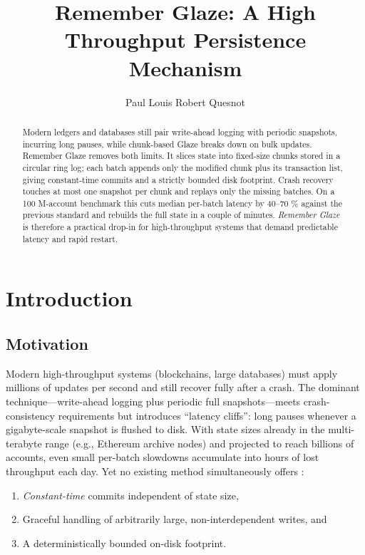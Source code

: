 \documentclass[conference]{IEEEtran}
\title{Remember Glaze: A High Throughput Persistence Mechanism}
\author{Paul Louis Robert Quesnot}
\begin{document}
\maketitle

\begin{abstract}
   Modern ledgers and databases still pair write-ahead logging with periodic snapshots, incurring long pauses, while chunk-based Glaze breaks down on bulk updates. Remember Glaze removes both limits. It slices state into fixed-size chunks stored in a circular ring log; each batch appends only the modified chunk plus its transaction list, giving constant-time commits and a strictly bounded disk footprint. Crash recovery touches at most one snapshot per chunk and replays only the missing batches. On a 100 M-account benchmark this cuts median per-batch latency by 40–70 \% against the previous standard and rebuilds the full state in a couple of minutes. \textit{Remember Glaze} is therefore a practical drop-in for high-throughput systems that demand predictable latency and rapid restart.
\end{abstract}

\section{Introduction}
\subsection{Motivation}

Modern high-throughput systems (blockchains, large databases) must apply millions of updates per second and still recover fully after a crash.  The dominant technique—write-ahead logging plus periodic full snapshots—meets crash-consistency requirements but introduces “latency cliffs”: long pauses whenever a gigabyte-scale snapshot is flushed to disk.  With state sizes already in the multi-terabyte range (e.g., Ethereum archive nodes) and projected to reach billions of accounts, even small per-batch slowdowns accumulate into hours of lost throughput each day. Yet no existing method simultaneously offers :

\begin{enumerate}
    \item \emph{Constant-time} commits independent of state size,
    \item Graceful handling of arbitrarily large, non-interdependent writes, and
    \item A deterministically bounded on-disk footprint.
\end{enumerate}
\end{document}
